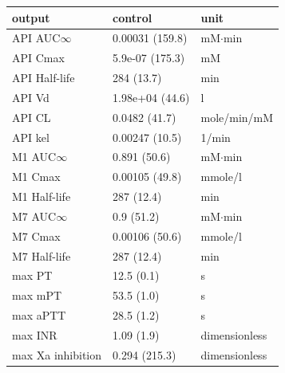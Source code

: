 \begin{tabular}{lll}
\toprule
output & control & unit \\
\midrule
API AUC$\infty$ & 0.00031 (159.8) & mM$\cdot$min \\
API Cmax & 5.9e-07 (175.3) & mM \\
API Half-life & 284 (13.7) & min \\
API Vd & 1.98e+04 (44.6) & l \\
API CL & 0.0482 (41.7) & mole/min/mM \\
API kel & 0.00247 (10.5) & 1/min \\
M1 AUC$\infty$ & 0.891 (50.6) & mM$\cdot$min \\
M1 Cmax & 0.00105 (49.8) & mmole/l \\
M1 Half-life & 287 (12.4) & min \\
M7 AUC$\infty$ & 0.9 (51.2) & mM$\cdot$min \\
M7 Cmax & 0.00106 (50.6) & mmole/l \\
M7 Half-life & 287 (12.4) & min \\
max PT & 12.5 (0.1) & s \\
max mPT & 53.5 (1.0) & s \\
max aPTT & 28.5 (1.2) & s \\
max INR & 1.09 (1.9) & dimensionless \\
max Xa inhibition & 0.294 (215.3) & dimensionless \\
\bottomrule
\end{tabular}
